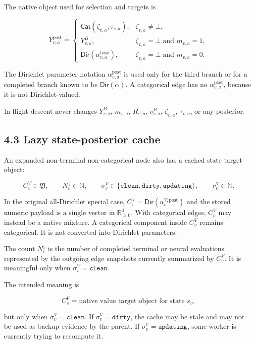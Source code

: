 \documentclass[11pt]{article}
\newcommand{\R}{\mathbb{R}}
\newcommand{\Native}{\mathfrak{Y}}
\newcommand{\DirObj}{\mathsf{Dir}}
\newcommand{\CatObj}{\mathsf{Cat}}
\begin{document}
The native object used for selection and targets is

\[
Y^{\mathrm{post}}_{v,a}
=
\begin{cases}
\CatObj(\zeta_{v,a},\tau_{v,a}),
& \zeta_{v,a}\ne\bot,\\[3pt]
Y^B_{v,a},
& \zeta_{v,a}=\bot\text{ and }m_{v,a}=1,\\[3pt]
\DirObj(\alpha^{\mathrm{base}}_{v,a}),
& \zeta_{v,a}=\bot\text{ and }m_{v,a}=0.
\end{cases}
\]

The Dirichlet parameter notation
\(\alpha^{\mathrm{post}}_{v,a}\) is used only for the third branch or for a
completed branch known to be \(\DirObj(\alpha)\). A categorical edge has no
\(\alpha^{\mathrm{post}}_{v,a}\), because it is not Dirichlet-valued.

In-flight descent never changes \(Y^B_{v,a}\), \(m_{v,a}\), \(R_{v,a}\),
\(\nu^B_{v,a}\), \(\zeta_{v,a}\), \(\tau_{v,a}\), or any posterior.

\subsection*{4.3 Lazy state-posterior cache}

An expanded non-terminal non-categorical node also has a cached state target
object:

\[
C^V_v\in\Native,
\qquad
N^\downarrow_v\in\mathbb{N},
\qquad
\sigma^V_v\in\{\texttt{clean},\texttt{dirty},\texttt{updating}\},
\qquad
\nu^V_v\in\mathbb{N}.
\]

In the original all-Dirichlet special case, \(C^V_v=\DirObj(\alpha^{V,
\mathrm{post}}_v)\) and the stored numeric payload is a single vector in
\(\R_{>0}^3\). With categorical edges, \(C^V_v\) may instead be a native mixture.
A categorical component inside \(C^V_v\) remains categorical. It is not converted
into Dirichlet parameters.

The count \(N^\downarrow_v\) is the number of completed terminal or neural
evaluations represented by the outgoing edge snapshots currently summarized by
\(C^V_v\). It is meaningful only when \(\sigma^V_v=\texttt{clean}\).

The intended meaning is

\[
C^V_v = \text{native value target object for state }s_v,
\]

but only when \(\sigma^V_v=\texttt{clean}\). If
\(\sigma^V_v=\texttt{dirty}\), the cache may be stale and may not be used as
backup evidence by the parent. If \(\sigma^V_v=\texttt{updating}\), some worker
is currently trying to recompute it.
\end{document}
